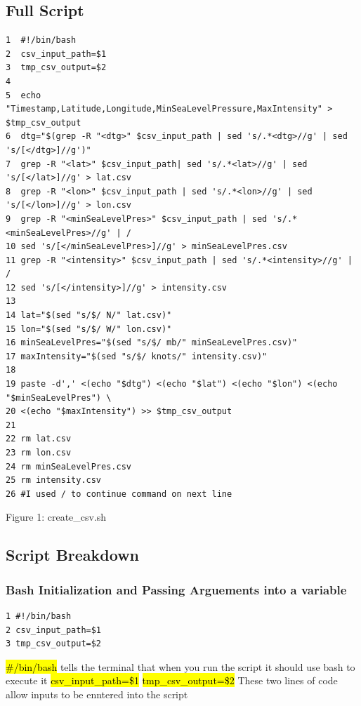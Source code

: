 \documentclass[]{article}
\begin{document}
\subsection{Full Script}
\begin{tcolorbox}[colback=white, colframe=black, boxrule=1pt, arc=2mm, 
    title=create\_csv.sh, width=6.7in, fonttitle=\bfseries, listing only, listing options={language=sh, basicstyle=\ttfamily}]
    \begin{verbatim}
1  #!/bin/bash
2  csv_input_path=$1
3  tmp_csv_output=$2
4
5  echo "Timestamp,Latitude,Longitude,MinSeaLevelPressure,MaxIntensity" > $tmp_csv_output
6  dtg="$(grep -R "<dtg>" $csv_input_path | sed 's/.*<dtg>//g' | sed 's/[</dtg>]//g')"
7  grep -R "<lat>" $csv_input_path| sed 's/.*<lat>//g' | sed 's/[</lat>]//g' > lat.csv
8  grep -R "<lon>" $csv_input_path | sed 's/.*<lon>//g' | sed 's/[</lon>]//g' > lon.csv
9  grep -R "<minSeaLevelPres>" $csv_input_path | sed 's/.*<minSeaLevelPres>//g' | /
10 sed 's/[</minSeaLevelPres>]//g' > minSeaLevelPres.csv
11 grep -R "<intensity>" $csv_input_path | sed 's/.*<intensity>//g' | / 
12 sed 's/[</intensity>]//g' > intensity.csv
13 
14 lat="$(sed "s/$/ N/" lat.csv)"
15 lon="$(sed "s/$/ W/" lon.csv)"
16 minSeaLevelPres="$(sed "s/$/ mb/" minSeaLevelPres.csv)"
17 maxIntensity="$(sed "s/$/ knots/" intensity.csv)"
18
19 paste -d',' <(echo "$dtg") <(echo "$lat") <(echo "$lon") <(echo "$minSeaLevelPres") \
20 <(echo "$maxIntensity") >> $tmp_csv_output
21
22 rm lat.csv
23 rm lon.csv
24 rm minSeaLevelPres.csv
25 rm intensity.csv
26 #I used / to continue command on next line
    \end{verbatim}
\end{tcolorbox}
\begin{center}
    Figure 1: create\_csv.sh
\end{center}
\subsection{Script Breakdown}
\subsubsection{Bash Initialization and Passing Arguements into a variable}
\begin{tcolorbox}[colback=white, colframe=black, boxrule=1pt, arc=2mm, 
    title=Bash Initialization and Passing Arguements into a variable, width=6.7in, fonttitle=\bfseries, listing only, listing options={language=sh, basicstyle=\ttfamily}]
    \begin{verbatim}
1 #!/bin/bash
2 csv_input_path=$1
3 tmp_csv_output=$2
    \end{verbatim}
\hl{\#\!/bin/bash}\newline
tells the terminal that when you run the script it should use bash to execute it\newline
\hl{csv\_input\_path=\$1}\newline
\hl{tmp\_csv\_output=\$2}\newline
These two lines of code allow inputs to be enntered into the script
\end{tcolorbox}
\end{document}

